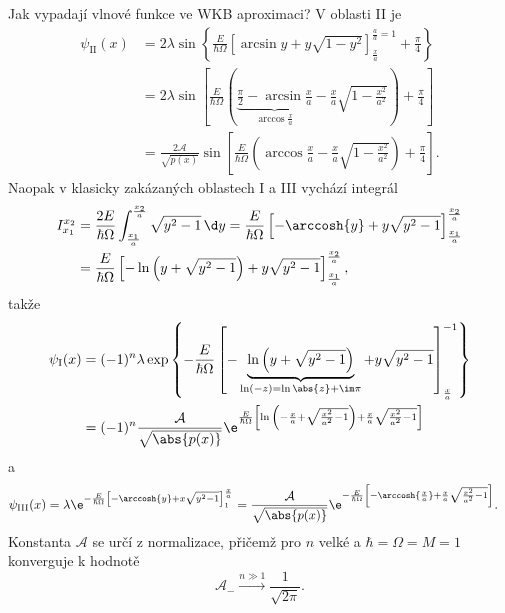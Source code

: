 \begin{solution}
	Jak vypadají vlnové funkce ve WKB aproximaci?
	V oblasti II je
	\begin{align}
		\psi_{\mathrm{II}}(x)
			&=2\lambda\sin{\left\{\frac{E}{\hbar\Omega}\left[\arcsin{y}+y\sqrt{1-y^{2}}\right]_{\frac{x}{a}}^{\frac{a}{a}=1}+\frac{\pi}{4}\right\}}\nonumber\\
			&=2\lambda\sin{\left[\frac{E}{\hbar\Omega}\left(\underbrace{\frac{\pi}{2}-\arcsin{\frac{x}{a}}}_{\arccos{\frac{x}{a}}}-\frac{x}{a}\sqrt{1-\frac{x^{2}}{a^{2}}}\right)+\frac{\pi}{4}\right]}\nonumber\\
			&=\frac{2\mathcal{A}}{\sqrt{p(x)}}\sin\left[\frac{E}{\hbar\Omega}\left(\arccos{\frac{x}{a}}-\frac{x}{a}\sqrt{1-\frac{x^{2}}{a^{2}}}\right)+\frac{\pi}{4}\right].
	\end{align}	
	Naopak v klasicky zakázaných oblastech I a III vychází integrál
	\begin{align}
		I_{x_{1}}^{x_{2}}
			&=\frac{2E}{\hbar\Omega}\int_{\frac{x_{1}}{a}}^{\frac{x_{2}}{a}}\sqrt{y^{2}-1}\,\d y
			 =\frac{E}{\hbar\Omega}\left[-\arccosh{y}+y\sqrt{y^{2}-1}\right]_{\frac{x_{1}}{a}}^{\frac{x_{2}}{a}}\nonumber\\
			&=\frac{E}{\hbar\Omega}\left[-\ln{\left(y+\sqrt{y^{2}-1}\right)}+y\sqrt{y^{2}-1}\right]_{\frac{x_{1}}{a}}^{\frac{x_{2}}{a}},
	\end{align}
	takže	
	\begin{align}
		\psi_{\mathrm{I}}(x)
			&=(-1)^{n}\lambda\exp\left\{-\frac{E}{\hbar\Omega}\left[-\underbrace{\ln{\left(y+\sqrt{y^{2}-1}\right)}}_{\ln(-z)=\ln{\abs{z}}+\im\pi}+y\sqrt{y^{2}-1}\right]_{\frac{x}{a}}^{-1}\right\}\nonumber\\
			&=(-1)^{n}\frac{\mathcal{A}}{\sqrt{\abs{p(x)}}}\e^{\frac{E}{\hbar\Omega}\left[\ln{\left(-\frac{x}{a}+\sqrt{\frac{x^{2}}{a^{2}}-1}\right)}+\frac{x}{a}\sqrt{\frac{x^{2}}{a^{2}}-1}\right]}
	\end{align}
	a
	\begin{align}
		\psi_{\mathrm{III}}(x)
			&=\lambda\e^{-\frac{E}{\hbar\Omega}\left[-\arccosh{y}+x\sqrt{y^{2}-1}\right]_{1}^{\frac{x}{a}}}
			 =\frac{\mathcal{A}}{\sqrt{\abs{p(x)}}}\e^{-\frac{E}{\hbar\Omega}\left[-\arccosh{\frac{x}{a}}+\frac{x}{a}\sqrt{\frac{x^{2}}{a^{2}}-1}\right]}.
	\end{align}
	Konstanta $\mathcal{A}$ se určí z normalizace, přičemž pro $n$ velké a $\hbar=\Omega=M=1$ konverguje k hodnotě
	\begin{equation}
		\label{eq:WKBHarmonicOscillatorNormalization}
		\mathcal{A}_{-}\xrightarrow{n\gg 1}\frac{1}{\sqrt{2\pi}}.		
	\end{equation}
	

\end{solution}
